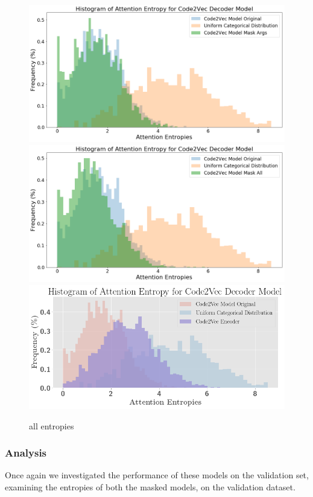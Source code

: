 \begin{figure}
\begin{center}
\includegraphics[width=0.8\linewidth]{ImagesCodeRelated/entropies_mask_args.png} 
\includegraphics[width=0.8\linewidth]{ImagesCodeRelated/entropies_mask_all.png}
\includegraphics[width=0.8\linewidth]{ImagesCodeRelated/entropies_encoder.png}
\end{center}
\caption{all entropies}
\label{fig:all_entropies}
\end{figure}


\subsubsection{Analysis} %

Once again we investigated the performance of these models on the validation set, examining the entropies of both the masked models, on the validation dataset.

